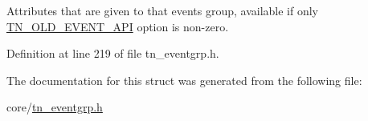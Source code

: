 Attributes that are given to that events group, available if only {\ttfamily \hyperlink{tn__cfg__default_8h_ac61d5f6a716cdcab205a2c8afbde4242}{T\+N\+\_\+\+O\+L\+D\+\_\+\+E\+V\+E\+N\+T\+\_\+\+A\+P\+I}} option is non-\/zero. 



Definition at line 219 of file tn\+\_\+eventgrp.\+h.



The documentation for this struct was generated from the following file\+:\begin{DoxyCompactItemize}
\item 
core/\hyperlink{tn__eventgrp_8h}{tn\+\_\+eventgrp.\+h}\end{DoxyCompactItemize}
